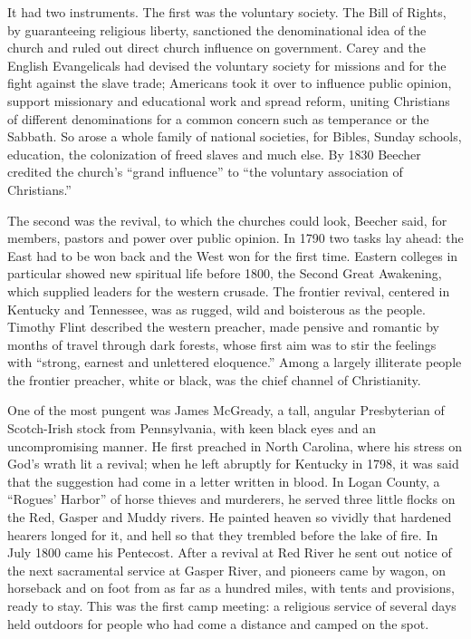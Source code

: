 It had two instruments. The first was the voluntary society. The Bill of Rights, by guaranteeing
religious liberty, sanctioned the denominational idea of the church and ruled out direct church
influence on government. Carey and the English Evangelicals had devised the voluntary society for
missions and for the fight against the slave trade; Americans took it over to influence public
opinion, support missionary and educational work and spread reform, uniting Christians of different
denominations for a common concern such as temperance or the Sabbath. So arose a whole family of national societies, for Bibles, Sunday schools, education, the colonization of freed slaves and much else. By 1830 Beecher credited the church's ``grand influence'' to ``the voluntary
association of Christians.''

The second was the revival, to which the churches could look, Beecher said, for members, pastors and
power over public opinion. In 1790 two tasks lay ahead: the East had to be won back and the West won for the first time. Eastern colleges in particular showed new spiritual life before 1800, the Second Great
Awakening, which supplied leaders for the western crusade. The frontier revival, centered in
Kentucky and Tennessee, was as rugged, wild and boisterous as the people. Timothy Flint described the
western preacher, made pensive and romantic by months of travel through dark forests, whose first aim
was to stir the feelings with ``strong, earnest and unlettered eloquence.'' Among a largely
illiterate people the frontier preacher, white or black, was the chief channel of Christianity.

One of the most pungent was James McGready, a tall, angular Presbyterian of Scotch-Irish stock from
Pennsylvania, with keen black eyes and an uncompromising manner. He first preached in North Carolina,
where his stress on God's wrath lit a revival; when he left abruptly for Kentucky in 1798, it was
said that the suggestion had come in a letter written in blood. In Logan County, a ``Rogues'
Harbor'' of horse thieves and murderers, he served three little flocks on the Red, Gasper and Muddy rivers. He painted heaven so vividly that hardened hearers longed for it, and hell so
that they trembled before the lake of fire. In July 1800 came his Pentecost. After a revival at Red
River he sent out notice of the next sacramental service at Gasper River, and pioneers came by wagon,
on horseback and on foot from as far as a hundred miles, with tents and provisions, ready to stay.
This was the first camp meeting: a religious service of several days held outdoors for people who
had come a distance and camped on the spot.

